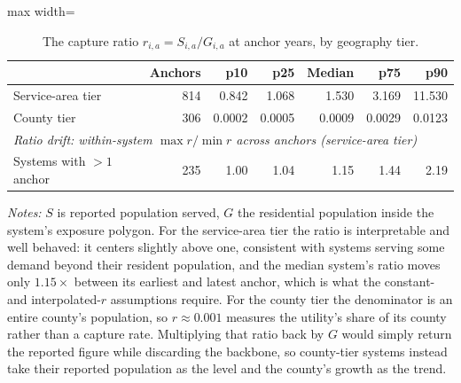 \begin{table}[ht]
\centering
\caption{The capture ratio $r_{i,a}=S_{i,a}/G_{i,a}$ at anchor years, by geography tier.}
\label{tab:backcast_ratio}
\begin{adjustbox}{max width=\textwidth}
\begin{tabular}{lrrrrrr}
\toprule
& Anchors & p10 & p25 & Median & p75 & p90 \\
\midrule
Service-area tier & 814 & 0.842 & 1.068 & 1.530 & 3.169 & 11.530 \\
County tier & 306 & 0.0002 & 0.0005 & 0.0009 & 0.0029 & 0.0123 \\
\midrule
\multicolumn{7}{l}{\textit{Ratio drift: within-system $\max r / \min r$ across anchors (service-area tier)}} \\
Systems with $>1$ anchor & 235 & 1.00 & 1.04 & 1.15 & 1.44 & 2.19 \\
\bottomrule
\end{tabular}
\end{adjustbox}
\begin{minipage}{\textwidth}\footnotesize
\vspace{0.5em}
\textit{Notes:} $S$ is reported population served, $G$ the residential population inside the system's exposure polygon. For the service-area tier the ratio is interpretable and well behaved: it centers slightly above one, consistent with systems serving some demand beyond their resident population, and the median system's ratio moves only $1.15\times$ between its earliest and latest anchor, which is what the constant- and interpolated-$r$ assumptions require. For the county tier the denominator is an entire county's population, so $r\approx 0.001$ measures the utility's share of its county rather than a capture rate. Multiplying that ratio back by $G$ would simply return the reported figure while discarding the backbone, so county-tier systems instead take their reported population as the level and the county's growth as the trend.
\end{minipage}
\end{table}
